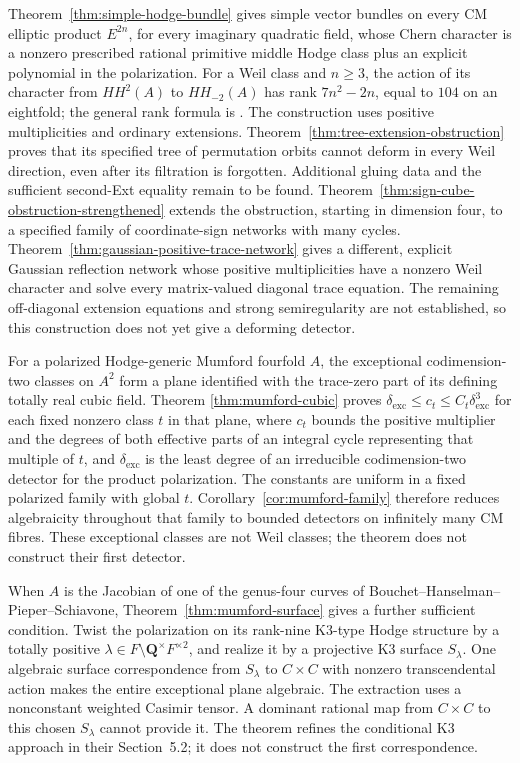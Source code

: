 \documentclass[11pt]{article}
\theoremstyle{definition}
\theoremstyle{remark}
\newcommand{\Q}{\mathbf Q}
\begin{document}
Theorem~\ref{thm:simple-hodge-bundle} gives simple vector bundles on
every CM elliptic product $E^{2n}$, for every imaginary quadratic
field, whose Chern character is a nonzero prescribed rational primitive
middle Hodge class plus an explicit polynomial in the polarization.
For a Weil class and $n\ge3$, the action of its character from
$HH^2(A)$ to $HH_{-2}(A)$ has rank
$7n^2-2n$, equal to $104$ on an eightfold; the general rank formula
is \cite[Theorem~A6]{BBK3Sixfolds}.
The construction uses positive multiplicities and ordinary extensions.
Theorem~\ref{thm:tree-extension-obstruction} proves that its specified
tree of permutation orbits cannot deform in every Weil direction,
even after its filtration is forgotten.  Additional gluing data and
the sufficient second-Ext equality remain to be found.
Theorem~\ref{thm:sign-cube-obstruction-strengthened} extends the obstruction, starting in dimension four, to a
specified family of coordinate-sign networks with many cycles.
Theorem~\ref{thm:gaussian-positive-trace-network} gives a different,
explicit Gaussian reflection network whose positive multiplicities
have a nonzero Weil character and solve every matrix-valued diagonal
trace equation.  The remaining off-diagonal extension equations and
strong semiregularity are not established, so this construction does
not yet give a deforming detector.

For a polarized Hodge-generic Mumford fourfold $A$, the exceptional
codimension-two classes on $A^2$ form a plane identified with the
trace-zero part of its defining totally real cubic field. Theorem
\ref{thm:mumford-cubic} proves
$\delta_{\mathrm{exc}}\leq c_t\leq C_t\delta_{\mathrm{exc}}^3$
for each fixed nonzero class $t$ in that plane, where $c_t$ bounds the positive multiplier and the degrees of both
effective parts of an integral cycle representing that multiple of $t$, and
$\delta_{\mathrm{exc}}$ is the least degree of an irreducible
codimension-two detector for the product polarization. The constants
are uniform in a fixed polarized family with global $t$.
Corollary~\ref{cor:mumford-family} therefore reduces algebraicity
throughout that family to bounded detectors on infinitely many CM
fibres. These exceptional classes are not Weil classes; the theorem
does not construct their first detector.

When $A$ is the Jacobian of one of the genus-four curves of Bouchet--Hanselman--Pieper--Schiavone, Theorem~\ref{thm:mumford-surface} gives a further sufficient condition. Twist the polarization on its rank-nine K3-type Hodge structure by a totally positive $\lambda\in F\setminus\Q^\times F^{\times2}$, and realize it by a projective K3 surface $S_\lambda$. One algebraic surface correspondence from $S_\lambda$ to $C\times C$ with nonzero transcendental action makes the entire exceptional plane algebraic. The extraction uses a nonconstant weighted Casimir tensor. A dominant rational map from $C\times C$ to this chosen $S_\lambda$ cannot provide it. The theorem refines the conditional K3 approach in their Section~5.2; it does not construct the first correspondence.
\end{document}

